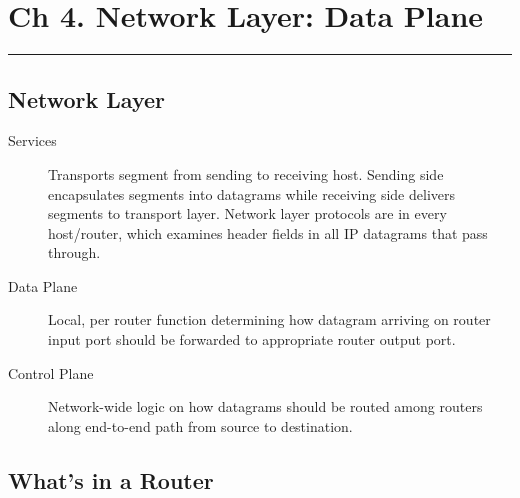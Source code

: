 \documentclass{article}
\begin{document}
\newpage

\section*{Ch 4. Network Layer: Data Plane}
\noindent
\rule{\linewidth}{0.5mm}
\noindent

\subsection*{Network Layer}

\begin{description}
    \item[Services] Transports segment from sending to receiving host. Sending side encapsulates 
    segments into datagrams while receiving side delivers segments to transport layer. Network layer
    protocols are in every host/router, which examines header fields in all IP datagrams that pass through.
    
    \item[Data Plane] Local, per router function determining how datagram arriving on router input 
    port should be forwarded to appropriate router output port.
    
    \item[Control Plane] Network-wide logic on how datagrams should be routed among routers along
    end-to-end path from source to destination. 
\end{description}

\subsection*{What's in a Router}
\end{document}
